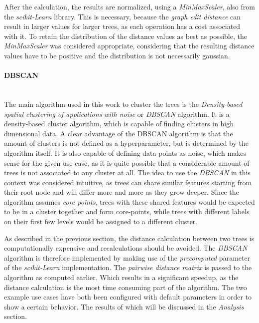 \documentclass[a4paper, 12pt]{article}
\begin{document}
After the calculation, the results are normalized, using a \textit{MinMaxScaler}, also from the
\textit{scikit-Learn} library. This is necessary, because the \textit{graph edit distance} can
result in larger values for larger trees, as each operation has a cost associated with it. To
retain the distribution of the distance values as best as possible, the \textit{MinMaxScaler}
was considered appropriate, considering that the resulting distance values have to be positive
and the distribution is not necessarily gaussian.

\paragraph{DBSCAN}\mbox{}\\
The main algorithm used in this work to cluster the trees is the \textit{Density-based spatial
    clustering of applications with noise} or \textit{DBSCAN} algorithm. It is
a density-based cluster algorithm, which is capable of finding clusters in high dimensional data.
A clear advantage of the DBSCAN algorithm is that the amount of clusters is not defined as a
hyperparameter, but is determined by the algorithm itself. It is also capable of defining data
points as noise, which makes sense for the given use case, as it is quite possible that a
considerable amount of trees is not associated to any cluster at all. The idea to use the
\textit{DBSCAN} in this context was considered intuitive, as trees can share similar features
starting from their root node and will differ more and more as they grow deeper. Since the
algorithm assumes \textit{core points}, trees with these shared features would be expected to
be in a cluster together and form core-points, while trees with different labels on their first
few levels would be assigned to a different cluster. \par

As described in the previous section, the distance calculation between two trees is computationally
expensive and recalculations should be avoided. The \textit{DBSCAN} algorithm is therefore
implemented by making use of the \textit{precomputed} parameter of the \textit{scikit-Learn}
implementation. The \textit{pairwise distance matrix} is passed to the algorithm as computed
earlier. Which results in a significant speedup, as the distance calculation is the most time
consuming part of the algorithm. The two example use cases have both been configured with default
parameters in order to show a certain behavior. The results of which will be discussed in the
\textit{Analysis} section. \par
\end{document}
